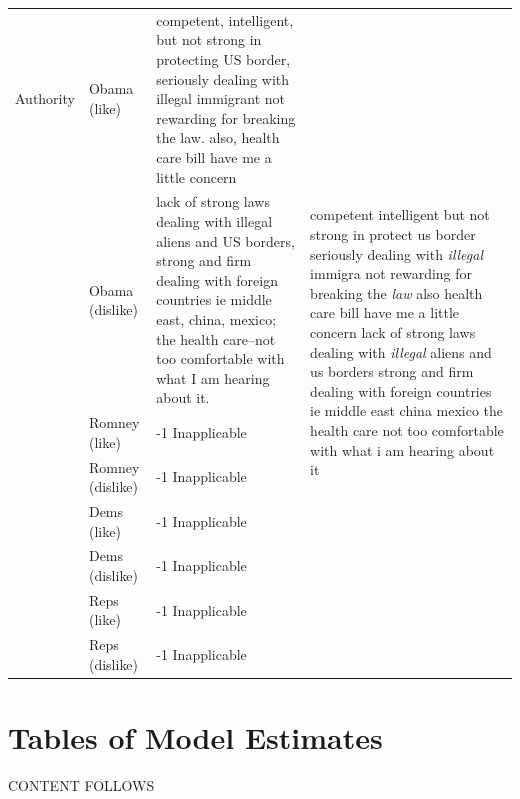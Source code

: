 \documentclass[12pt]{article}
\begin{document}
\begin{footnotesize}
\begin{center}
\begin{longtable}{lp{1.5cm}p{5.5cm}p{5.5cm}}
	 Authority & Obama (like) & competent, intelligent, but not strong in protecting US border, seriously dealing with illegal immigrant not rewarding for breaking the law. also, health care bill have me a little concern & \multirow{8}{5.5cm}{competent intelligent but not strong in protect us border seriously dealing with \textit{illegal} immigra not rewarding for breaking the \textit{law} also health care bill have me a little concern lack of strong laws dealing with \textit{illegal} aliens and us borders strong and firm dealing with foreign countries ie middle east china mexico the health care not too comfortable with what i am hearing about it} \\
	 	 & Obama (dislike) & lack of strong laws dealing with illegal aliens and US borders, strong and firm dealing with foreign countries ie middle east, china, mexico; the health care--not too comfortable with what I am hearing about it. \\
	 	 & Romney (like) & -1 Inapplicable \\
	 	 & Romney (dislike) & -1 Inapplicable \\
	 	 & Dems (like) & -1 Inapplicable \\
	 	 & Dems (dislike) & -1 Inapplicable \\
	 	 & Reps (like) & -1 Inapplicable \\
	 	 & Reps (dislike) & -1 Inapplicable \\
\end{longtable}
\end{center}

\end{footnotesize}





\clearpage
\section{Tables of Model Estimates}\label{app:tables}
\renewcommand\thefigure{\thesection.\arabic{figure}}
\renewcommand\thetable{\thesection.\arabic{table}}
\setcounter{figure}{0}
\setcounter{table}{0}


CONTENT FOLLOWS
\end{document}
